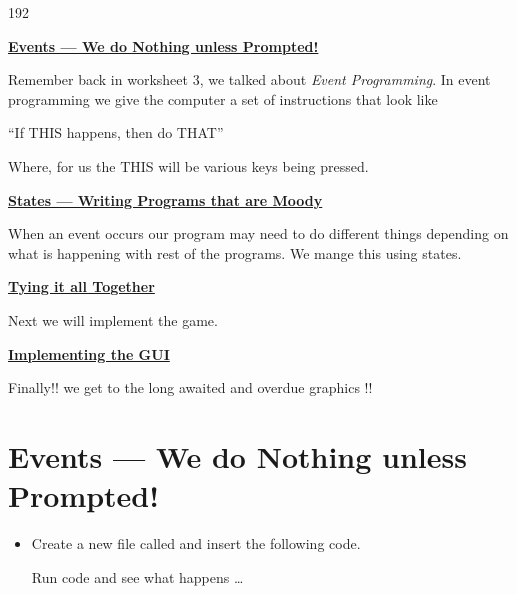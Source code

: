 \documentclass{coderdojo}
\newcommand\contentsitem[2]{
	\item \hyperref[#1]{\color{section}\bfseries #2}
}
\newcommand\TODO[1]{
\begin{itemize}
\item[\todoSymbol] \color{todo} #1
\end{itemize}}
\begin{document}
\begin{dingautolist}{192}

\contentsitem{physics}{Events --- We do Nothing unless Prompted!}

Remember back in worksheet 3, we talked about {\em Event Programming}. In event programming we give the computer a set of instructions that look like 

\centerline{``If THIS happens, then do THAT''}

Where, for us the THIS will be various keys being pressed.

\contentsitem{drop}{States --- Writing Programs that are Moody}

When an event occurs our program may need to do different things depending on what is happening with rest of the programs. We mange this using states.

\contentsitem{drop}{Tying it all Together}

Next we will implement the game.

\contentsitem{drop}{Implementing the GUI}

Finally!! we get to the long awaited and overdue graphics !!

\end{dingautolist}

\clearpage

\section{Events --- We do Nothing unless Prompted!}

\TODO{Create a new file called  and insert the following code.

Run code and see what happens \ldots}

\end{document}
